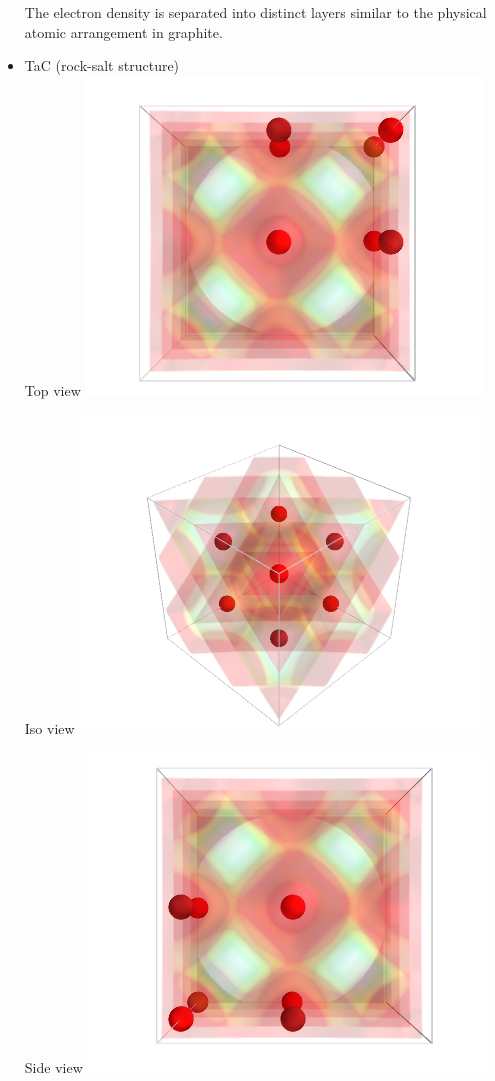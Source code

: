 \documentclass[11pt]{article}
\begin{document}
\begin{itemize}
The electron density is separated into distinct layers similar to the physical atomic arrangement in graphite.


\item TaC (rock-salt structure)\\
\label{sec-1-6-2-3}%
Top view
\includegraphics[width=.9\linewidth]{./images/TaC_top.png}

Iso view
\includegraphics[width=.9\linewidth]{./images/TaC_iso.png}

Side view
\includegraphics[width=.9\linewidth]{./images/TaC_side.png}


\end{itemize}
\end{document}
